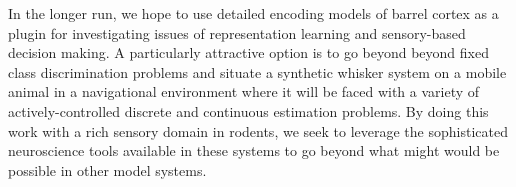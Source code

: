 In the longer run, we hope to use detailed encoding models of barrel cortex as a plugin for investigating issues of representation learning and sensory-based decision making. 
A particularly attractive option is to go beyond beyond fixed class discrimination problems and situate a synthetic whisker system on a mobile animal in a navigational environment where it will be faced with a variety of actively-controlled discrete and continuous estimation problems.
By doing this work with a rich sensory domain in rodents, we seek to leverage the sophisticated neuroscience tools available in these systems to go beyond what might would be possible in other model systems.  


